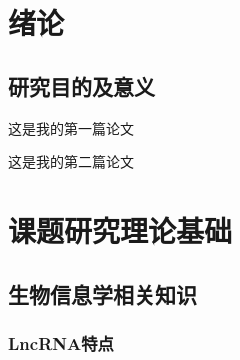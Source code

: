 \section{绪论}
\subsection{研究目的及意义}


这是我的第一篇论文\cite{xuan_dynamic_2022}

这是我的第二篇论文\cite{10.1093/bib/bbac009}

\pagebreak

\section{课题研究理论基础}
\subsection{生物信息学相关知识}
\subsubsection{LncRNA特点}